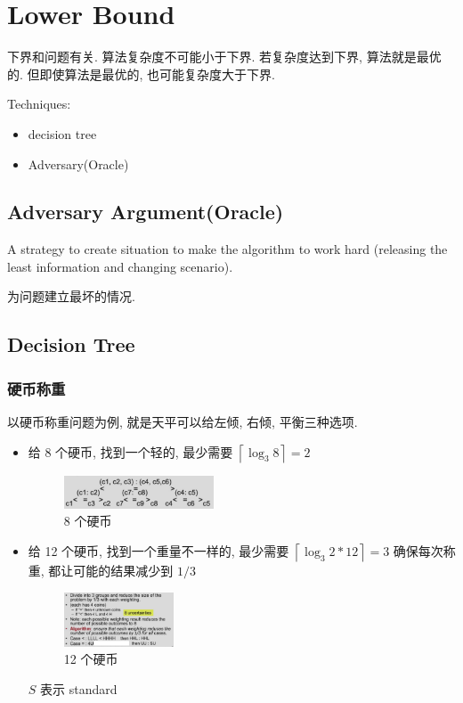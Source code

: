\newpage
\section{Lower Bound}
下界和问题有关. 算法复杂度不可能小于下界. 若复杂度达到下界, 算法就是最优的. 但即使算法是最优的, 也可能复杂度大于下界. 

Techniques:
\begin{itemize}
    \item decision tree
    \item Adversary(Oracle)
\end{itemize}

\subsection{Adversary Argument(Oracle)}
\begin{definition}[Adversary]
    A strategy to create situation to make the algorithm to work hard (releasing the least information and changing scenario).
\end{definition}

为问题建立最坏的情况. 


\subsection{Decision Tree}
\subsubsection{硬币称重}
以硬币称重问题为例, 就是天平可以给左倾, 右倾, 平衡三种选项. 

\begin{itemize}
    \item 给 8 个硬币, 找到一个轻的, 最少需要 $\left\lceil \log_3 8 \right\rceil=2$
    \begin{figure}[H]
        \centering
        \includegraphics[width=0.42\textwidth]{pic/DAA2/8coin.png}
        \caption{8 个硬币}
    \end{figure}
    
    \item 给 12 个硬币, 找到一个重量不一样的, 最少需要 $\left\lceil \log_3 2*12 \right\rceil=3$
    \subitem 确保每次称重, 都让可能的结果减少到 $1/3$

    \begin{figure}[H]
        \centering
        \includegraphics[width=0.309\textwidth]{pic/DAA2/12coin.png}
        \caption{12 个硬币}
    \end{figure}
    $S$ 表示 standard
\end{itemize}

